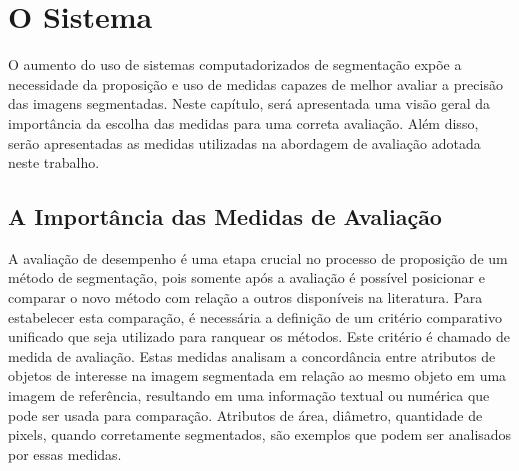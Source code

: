 
\chapter{O Sistema}
\thispagestyle{empty}

O aumento do uso de sistemas computadorizados de segmenta\c{c}\~{a}o exp\~{o}e a necessidade da proposi\c{c}\~{a}o e uso de medidas capazes de melhor avaliar a precis\~{a}o das imagens segmentadas. Neste cap\'{i}tulo, ser\'{a} apresentada uma vis\~{a}o geral da import\^{a}ncia da escolha das medidas para uma correta avalia\c{c}\~{a}o. Al\'{e}m disso, ser\~{a}o apresentadas as medidas utilizadas na abordagem de avalia\c{c}\~{a}o adotada neste trabalho.

\section{A Import\^{a}ncia das Medidas de Avalia\c{c}\~{a}o}

A avalia\c{c}\~{a}o  de desempenho \'{e} uma etapa crucial no processo de proposi\c{c}\~{a}o de um m\'{e}todo de segmenta\c{c}\~{a}o, pois somente ap\'{o}s a avalia\c{c}\~{a}o \'{e} poss\'{i}vel posicionar e comparar o novo m\'{e}todo com rela\c{c}\~{a}o a outros  dispon\'{i}veis na literatura. Para estabelecer esta compara\c{c}\~{a}o, \'{e} necess\'{a}ria a defini\c{c}\~{a}o de um crit\'{e}rio comparativo unificado que seja utilizado para ranquear os m\'{e}todos. Este crit\'{e}rio \'{e} chamado de medida de avalia\c{c}\~{a}o. Estas medidas analisam a concord\^{a}ncia entre atributos de objetos de interesse na imagem segmentada em rela\c{c}\~{a}o ao mesmo objeto em uma imagem de refer\^{e}ncia, resultando em uma informa\c{c}\~{a}o textual ou num\'{e}rica que pode ser usada para compara\c{c}\~{a}o. Atributos de \'{a}rea, di\^{a}metro, quantidade de pixels, quando corretamente segmentados, s\~{a}o exemplos que podem ser analisados por essas medidas.

